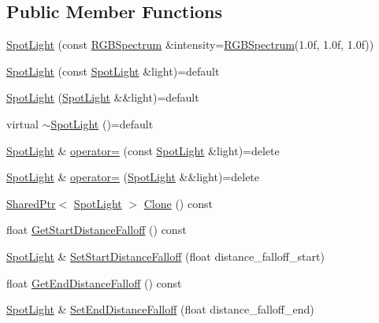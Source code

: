 \subsection*{Public Member Functions}
\begin{DoxyCompactItemize}
\item 
\hyperlink{classmage_1_1_spot_light_adc5c7b5fead1b7b0c8728ffd816a9ada}{Spot\+Light} (const \hyperlink{structmage_1_1_r_g_b_spectrum}{R\+G\+B\+Spectrum} \&intensity=\hyperlink{structmage_1_1_r_g_b_spectrum}{R\+G\+B\+Spectrum}(1.\+0f, 1.\+0f, 1.\+0f))
\item 
\hyperlink{classmage_1_1_spot_light_adac6974e9cbfdae4612e2d88229e654d}{Spot\+Light} (const \hyperlink{classmage_1_1_spot_light}{Spot\+Light} \&light)=default
\item 
\hyperlink{classmage_1_1_spot_light_a404e8f8f37100bff11042831ff22fe8f}{Spot\+Light} (\hyperlink{classmage_1_1_spot_light}{Spot\+Light} \&\&light)=default
\item 
virtual \hyperlink{classmage_1_1_spot_light_a924dd88ca89b3064d6cfce546eab322a}{$\sim$\+Spot\+Light} ()=default
\item 
\hyperlink{classmage_1_1_spot_light}{Spot\+Light} \& \hyperlink{classmage_1_1_spot_light_aeae25635a302f387fcbe66dd2f6d0ad7}{operator=} (const \hyperlink{classmage_1_1_spot_light}{Spot\+Light} \&light)=delete
\item 
\hyperlink{classmage_1_1_spot_light}{Spot\+Light} \& \hyperlink{classmage_1_1_spot_light_aa33ea14e6a55db09f6d0785b67277ad0}{operator=} (\hyperlink{classmage_1_1_spot_light}{Spot\+Light} \&\&light)=delete
\item 
\hyperlink{namespacemage_a1e01ae66713838a7a67d30e44c67703e}{Shared\+Ptr}$<$ \hyperlink{classmage_1_1_spot_light}{Spot\+Light} $>$ \hyperlink{classmage_1_1_spot_light_aa2c787093d1fc29d79c11ecab40f33fd}{Clone} () const
\item 
float \hyperlink{classmage_1_1_spot_light_a78ef6cc0ecd04cff8a4db9270e9ecb99}{Get\+Start\+Distance\+Falloff} () const
\item 
\hyperlink{classmage_1_1_spot_light}{Spot\+Light} \& \hyperlink{classmage_1_1_spot_light_a0e31dd3527aafc860e7a5c31aaf673d1}{Set\+Start\+Distance\+Falloff} (float distance\+\_\+falloff\+\_\+start)
\item 
float \hyperlink{classmage_1_1_spot_light_a3e6767992846e17a9bebb66519c30f19}{Get\+End\+Distance\+Falloff} () const
\item 
\hyperlink{classmage_1_1_spot_light}{Spot\+Light} \& \hyperlink{classmage_1_1_spot_light_a58a1aeffdcee3e54038cd2f40edd8a52}{Set\+End\+Distance\+Falloff} (float distance\+\_\+falloff\+\_\+end)

\end{DoxyCompactItemize}
